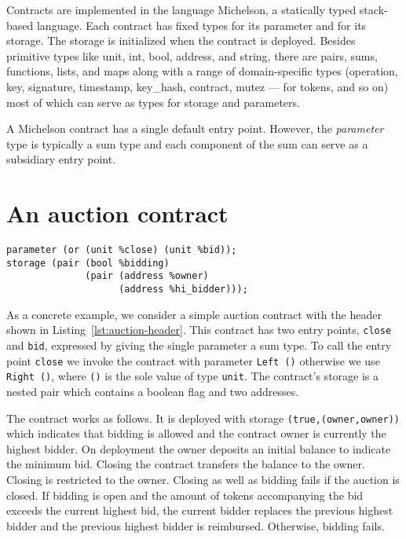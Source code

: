 \documentclass[a4paper,USenglish,american,cleveref, autoref, thm-restate]{oasics-v2021}
\begin{document}
Contracts are implemented in the language Michelson, a statically typed
stack-based language. Each contract has fixed types for its parameter
and for its storage. The storage is initialized when the contract is
deployed. Besides primitive types like unit, int, bool, address, and string,
there are pairs, sums, functions, lists, and maps along with a range
of domain-specific types (operation, key, signature, timestamp,
key\_hash, contract, mutez --- for tokens, and so on) most of which
can serve as types for storage and parameters.

A Michelson contract has a single default entry point. However, the \textit{parameter} type is
typically a sum type and each component of the sum can serve as a subsidiary entry point. 

\section{An auction contract}
\label{sec:an-auction-contract}
\begin{lstlisting}[float,caption={Simple auction contract (auction.tz)},captionpos=b,label={lst:auction-header},language=michelson,numbers=none,emph={close,bid,bidding,owner,hi_bidder},emphstyle=\underbar]
parameter (or (unit %close) (unit %bid));
storage (pair (bool %bidding)
              (pair (address %owner)
                    (address %hi_bidder)));
\end{lstlisting}

As a concrete example, we consider a simple auction contract with the
header shown in Listing~\ref{lst:auction-header}. 
This contract has two entry points, \lstinline/close/ and \lstinline/bid/,
expressed by giving the single parameter a sum type. To call the
entry point \lstinline/close/ we invoke the contract with parameter \lstinline/Left ()/
otherwise we use \lstinline/Right ()/, where \lstinline/()/ is the sole
value of type \lstinline/unit/. The contract's storage is a nested pair which
contains a boolean flag and two addresses.

The contract works as follows. It is deployed with storage
\lstinline/(true,(owner,owner))/ which indicates that bidding is
allowed and the contract owner is currently the highest
bidder. On deployment the owner deposits an initial balance to indicate the
minimum bid. Closing the contract transfers the balance to the
owner. Closing is restricted to the owner. Closing as well as bidding fails
if the auction is
closed. If bidding is open and the amount of tokens accompanying the bid exceeds the
current highest bid, the current bidder replaces the previous highest
bidder and the previous highest bidder is reimbursed. Otherwise,
bidding fails.
\end{document}
